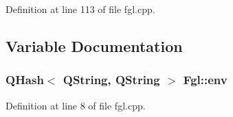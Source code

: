 Definition at line 113 of file fgl.cpp.



\subsection{Variable Documentation}
\hypertarget{namespaceFgl_a2efd7c9f3a914495e4d1ad2c0d557dc9}{
\subsubsection[{env}]{\setlength{\rightskip}{0pt plus 5cm}QHash$<$ QString, QString $>$ {\bf Fgl::env}}}
\label{namespaceFgl_a2efd7c9f3a914495e4d1ad2c0d557dc9}


Definition at line 8 of file fgl.cpp.

